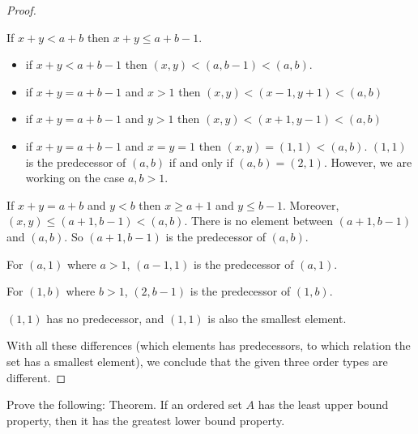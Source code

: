 \begin{proof}
\begin{enumerate}[label={(\roman*)}]
              If $x + y < a + b$ then $x + y \leq a + b - 1$.
              \begin{itemize}
                  \item if $x + y < a + b - 1$ then $(x, y) < (a, b - 1) < (a, b)$.\item if $x + y = a + b - 1$ and $x > 1$ then $(x, y) < (x-1, y+1) < (a, b)$
                  \item if $x + y = a + b - 1$ and $y > 1$ then $(x, y) < (x+1, y-1) < (a, b)$
                  \item if $x + y = a + b - 1$ and $x = y = 1$ then $(x, y) = (1, 1) < (a, b)$. $(1, 1)$ is the predecessor of $(a, b)$ if and only if $(a, b) = (2, 1)$. However, we are working on the case $a, b > 1$.
              \end{itemize}

              If $x + y = a + b$ and $y < b$ then $x\geq a + 1$ and $y\leq b - 1$. Moreover, $(x, y)\leq (a+1, b-1) < (a, b)$. There is no element between $(a+1,b-1)$ and $(a, b)$. So $(a+1, b-1)$ is the predecessor of $(a, b)$.

              For $(a, 1)$ where $a > 1$, $(a-1, 1)$ is the predecessor of $(a, 1)$.

              For $(1, b)$ where $b > 1$, $(2, b-1)$ is the predecessor of $(1, b)$.

              $(1, 1)$ has no predecessor, and $(1, 1)$ is also the smallest element.
    \end{enumerate}

    With all these differences (which elements has predecessors, to which relation the set has a smallest element), we conclude that the given three order types are different.
\end{proof}

\begin{exercise}\label{chapter1:section3:exercise13}
    Prove the following: Theorem. If an ordered set $A$ has the least upper bound property, then it has the greatest lower bound property.
\end{exercise}

